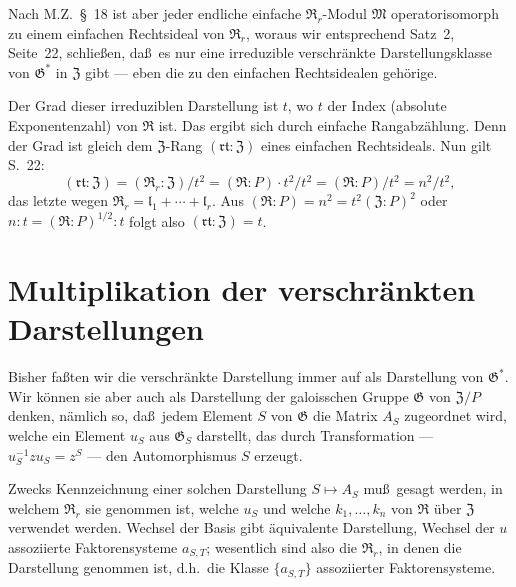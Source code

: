 \documentclass[12pt,a4paper]{article}
\theoremstyle{plain}
\theoremstyle{definition}
\theoremstyle{remark}
\begin{document}
Nach M.Z.\ \S~18 ist aber jeder endliche einfache $\mathfrak{R}_{r}$-Modul
$\mathfrak{M}$ operatorisomorph zu einem einfachen Rechtsideal von $\mathfrak{R}_{r}$,
woraus wir entsprechend Satz~2, Seite~22, schlie\ss en, da\ss\ es nur eine
irreduzible verschr\"ankte Darstellungsklasse von $\mathfrak{G}^{*}$ in $\mathfrak{Z}$ gibt ---
eben die zu den einfachen Rechtsidealen geh\"orige.

Der Grad dieser irreduziblen Darstellung ist $t$, wo $t$ der Index
(absolute Exponentenzahl) von $\mathfrak{R}$ ist. Das ergibt sich durch einfache
Rangabz\"ahlung. Denn der Grad ist gleich dem $\mathfrak{Z}$-Rang
$(\mathfrak{rt} : \mathfrak{Z})$ eines einfachen Rechtsideals. Nun gilt S.~22:
\[
(\mathfrak{rt} : \mathfrak{Z}) = (\mathfrak{R}_{r} : \mathfrak{Z}) / t^{2} = (\mathfrak{R} : P) \cdot t^{2} / t^{2}
= (\mathfrak{R} : P) / t^{2} = n^{2}/t^{2},
\]
das letzte wegen $\mathfrak{R}_{r} = \mathfrak{l}_{1} + \cdots + \mathfrak{l}_{r}$. Aus
$(\mathfrak{R} : P) = n^{2} = t^{2}(\mathfrak{Z} : P)^{2}$ oder $n:t = (\mathfrak{R} : P)^{1/2} : t$
folgt also $(\mathfrak{rt} : \mathfrak{Z}) = t$.

\newpage
\section{Multiplikation der verschr\"ankten Darstellungen}\label{sec:26}

Bisher fa\ss ten wir die verschr\"ankte Darstellung immer auf als
Darstellung von $\mathfrak{G}^{*}$. Wir k\"onnen sie aber auch als Darstellung der
galoisschen Gruppe $\mathfrak{G}$ von $\mathfrak{Z}/P$ denken, n\"amlich so, da\ss\ jedem
Element $S$ von $\mathfrak{G}$ die Matrix $A_{S}$ zugeordnet wird, welche ein
Element $u_{S}$ aus $\mathfrak{G}_{S}$ darstellt, das durch Transformation ---
$u_{S}^{-1}zu_{S} = z^{S}$ --- den Automorphismus $S$ erzeugt.

Zwecks Kennzeichnung einer solchen Darstellung $S \mapsto A_{S}$ mu\ss\ gesagt werden, in welchem $\mathfrak{R}_{r}$ sie genommen ist, welche $u_{S}$ und
welche $k_{1}, \ldots, k_{n}$ von $\mathfrak{R}$ \"uber $\mathfrak{Z}$ verwendet werden. Wechsel
der Basis gibt \"aquivalente Darstellung, Wechsel der $u$ assoziierte
Faktorensysteme $a_{S,T}$; wesentlich sind also die $\mathfrak{R}_{r}$, in denen die
Darstellung genommen ist, d.h.\ die Klasse $\{a_{S,T}\}$ assoziierter
Faktorensysteme.
\end{document}
